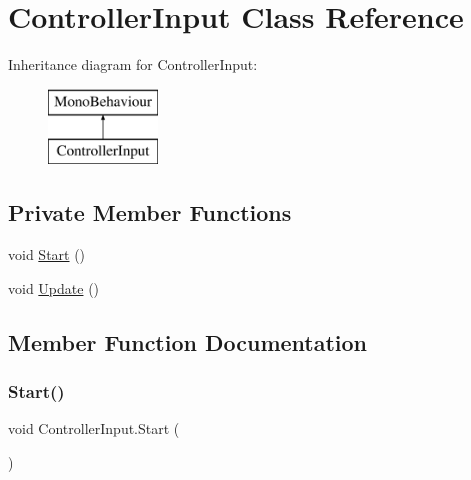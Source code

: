 \hypertarget{class_controller_input}{}\section{Controller\+Input Class Reference}
\label{class_controller_input}
Inheritance diagram for Controller\+Input\+:\begin{figure}[H]
\begin{center}
\leavevmode
\includegraphics[height=2.000000cm]{class_controller_input}
\end{center}
\end{figure}
\subsection*{Private Member Functions}
\begin{DoxyCompactItemize}
\item 
void \hyperlink{class_controller_input_a57631a3a94346974f8db61537186f8d4}{Start} ()
\item 
void \hyperlink{class_controller_input_a37b3daf7614d8502a772b6f9a17317ed}{Update} ()
\end{DoxyCompactItemize}


\subsection{Member Function Documentation}
\mbox{\label{class_controller_input_a57631a3a94346974f8db61537186f8d4}} 
\subsubsection{\texorpdfstring{Start()}{Start()}}
{\footnotesize\ttfamily void Controller\+Input.\+Start (\begin{DoxyParamCaption}{ }\end{DoxyParamCaption})\hspace{0.3cm}{\ttfamily [private]}}

\mbox{\label{class_controller_input_a37b3daf7614d8502a772b6f9a17317ed}} 
